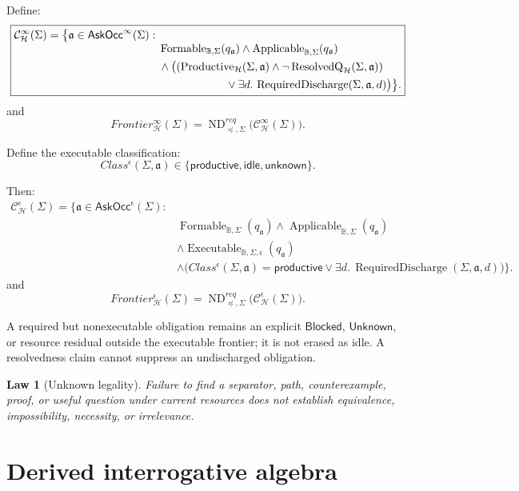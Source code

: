 \documentclass[11pt,oneside]{article}
\newtheorem{law}[definition]{Law}
\newcommand{\B}{\mathbb B}
\newcommand{\Applicable}{\operatorname{Applicable}}
\newcommand{\Formable}{\operatorname{Formable}}
\newcommand{\Executable}{\operatorname{Executable}}
\newcommand{\Productive}{\operatorname{Productive}}
\newcommand{\ResolvedQ}{\operatorname{ResolvedQ}}
\newcommand{\RequiredDischarge}{\operatorname{RequiredDischarge}}
\newcommand{\AskRef}{\mathfrak a}
\newcommand{\ND}{\operatorname{ND}}
\begin{document}
Define:
\[
\boxed{
\begin{aligned}
\mathcal C^\infty_{\mathcal H}(\Sigma)
=\bigl\{\AskRef\in\mathsf{AskOcc}^\infty(\Sigma):{}&\\[-1mm]
&\Formable_{\B,\Sigma}(q_{\AskRef})
 \land\Applicable_{\B,\Sigma}(q_{\AskRef})\\
&\land\bigl(
  (\Productive_{\mathcal H}(\Sigma,\AskRef)
   \land\neg\ResolvedQ_{\mathcal H}(\Sigma,\AskRef))\\
&\hspace{21mm}\lor
  \exists d.\,\RequiredDischarge(\Sigma,\AskRef,d)
\bigr)\bigr\}.
\end{aligned}
}
\]
and
\[
\boxed{
Frontier^\infty_{\mathcal H}(\Sigma)
=\ND_{\preceq,\Sigma}^{req}\bigl(\mathcal C^\infty_{\mathcal H}(\Sigma)\bigr).
}
\]

Define the executable classification:
\[
Class^\epsilon(\Sigma,\AskRef)
\in
\{
\mathsf{productive},
\mathsf{idle},
\mathsf{unknown}
\}.
\]

Then:
\[
\boxed{
\begin{aligned}
\mathcal C^\epsilon_{\mathcal H}(\Sigma)
=\bigl\{\AskRef\in\mathsf{AskOcc}^\epsilon(\Sigma):{}&\\[-1mm]
&\Formable_{\B,\Sigma}(q_{\AskRef})
 \land\Applicable_{\B,\Sigma}(q_{\AskRef})\\
&\land\Executable_{\B,\Sigma,\epsilon}(q_{\AskRef})\\
&\land\bigl(Class^\epsilon(\Sigma,\AskRef)=\mathsf{productive}
  \lor\exists d.\,\RequiredDischarge(\Sigma,\AskRef,d)\bigr)
\bigr\}.
\end{aligned}
}
\]
and
\[
\boxed{
Frontier^\epsilon_{\mathcal H}(\Sigma)
=\ND_{\preceq,\Sigma}^{req}\bigl(\mathcal C^\epsilon_{\mathcal H}(\Sigma)\bigr).
}
\]

A required but nonexecutable obligation remains an explicit \(\mathsf{Blocked}\),
\(\mathsf{Unknown}\), or resource residual outside the executable frontier; it is not erased as
idle.  A resolvedness claim cannot suppress an undischarged obligation.

\begin{law}[Unknown legality]
Failure to find a separator, path, counterexample, proof, or useful question under current resources does not establish equivalence, impossibility, necessity, or irrelevance.
\end{law}

\section{Derived interrogative algebra}\label{sec:derived-interrogative-algebra}
\end{document}

